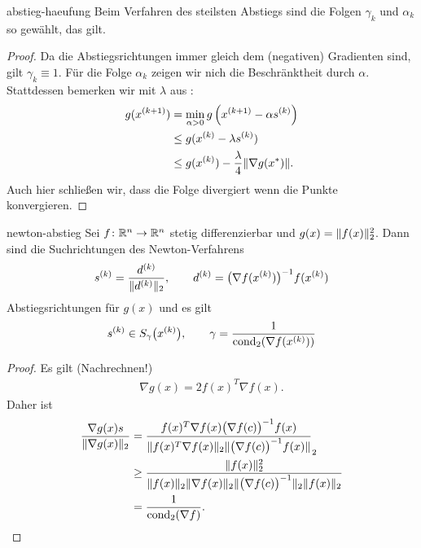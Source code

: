 \begin{Korollar}{abstieg-haeufung}
  Beim Verfahren des steilsten Abstiegs sind die Folgen $\gamma_k$ und
  $\alpha_k$ so gewählt, das  gilt.
\end{Korollar}

\begin{proof}
  Da die Abstiegsrichtungen immer gleich dem (negativen) Gradienten
  sind, gilt $\gamma_k \equiv 1$. Für die Folge $\alpha_k$ zeigen wir
  nich die Beschränktheit durch $\alpha$. Stattdessen bemerken wir mit
  $\lambda$ aus :
  \begin{align}
    g(x^{(k+1)})
    &= \min_{\alpha>0} g\left(x^{(k+1)}-\alpha s^{(k)}\right)\\
    &\le g(x^{(k)}-\lambda s^{(k)})\\
    &\le g(x^{(k)}) - \frac{\lambda}4 \lVert\nabla g(x^*)\rVert.
  \end{align}
  Auch hier schließen wir, dass die Folge divergiert wenn die Punkte konvergieren.
\end{proof}

\begin{Lemma}{newton-abstieg}
  Sei $f\colon \mathbb R^n\to \mathbb R^n$ stetig differenzierbar und
  $g(x) = \lVert f(x)\rVert_2^2$.  Dann sind die Suchrichtungen des Newton-Verfahrens
  \begin{gather}
    s^{(k)} = \frac{d^{(k)}}{\lVert d^{(k)}\rVert_2},
    \qquad d^{(k)} = \bigl(\nabla f(x^{(k)})\bigr)^{-1}f(x^{(k)})
  \end{gather}
  Abstiegsrichtungen für $g(x)$ und es gilt
  \begin{gather}
    s^{(k)} \in S_\gamma\bigl(x^{(k)}\bigr),
    \qquad
    \gamma = \frac{1}{\operatorname{cond}_2(\nabla f(x^{(k)}))}
  \end{gather}
\end{Lemma}

\begin{proof}
  Es gilt (Nachrechnen!)
  \begin{gather}
    \nabla g(x) = 2 f(x)^T\nabla f(x).
  \end{gather}
  Daher ist
  \begin{align}
    \frac{\nabla g(x) s}{\lVert\nabla g(x)\rVert_2}
    &= \frac{f(x)^T \nabla f(x) \bigl(\nabla f(c)\bigr)^{-1} f(x)}
      {\lVert f(x)^T\nabla f(x)\rVert_2\lVert\bigl(\nabla f(c)\bigr)^{-1} f(x)\rVert}_2\\
    &\ge \frac{\lVert f(x)\rVert^2_2}{\lVert f(x)\rVert_2\lVert\nabla f(x)\rVert_2\lVert\bigl(\nabla f(c)\bigr)^{-1}\rVert_2\lVert f(x)\rVert_2}\\
    &= \frac1{\operatorname{cond}_2(\nabla f)}.
  \end{align}
\end{proof}

